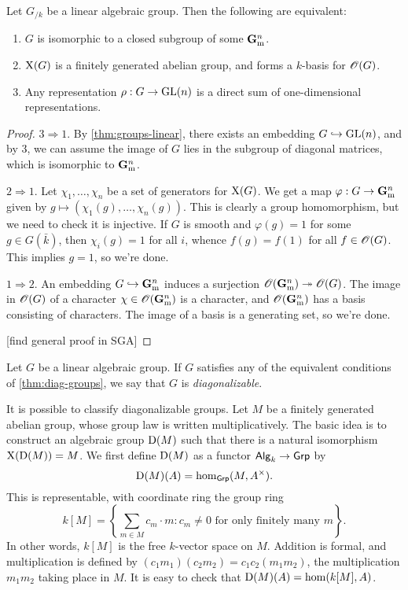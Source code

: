 \begin{theorem}\label{thm:diag-groups}
Let $G_{/k}$ be a linear algebraic group. Then the following are equivalent: 
\begin{enumerate}
\item
$G$ is isomorphic to a closed subgroup of some $\mathbf{G}_\mathrm{m}^n$. 

\item
$\operatorname{X}(G)$ is a finitely generated abelian group, and forms a $k$-basis 
for $\mathscr{O}(G)$. 

\item 
Any representation $\rho:G\to \operatorname{GL}(n)$ is a direct sum of one-dimensional 
representations. 
\end{enumerate}
\end{theorem}
\begin{proof}
$3\Rightarrow 1$. By \autoref{thm:groups-linear}, there exists an embedding 
$G\hookrightarrow \operatorname{GL}(n)$, and by 3, we can assume the image of $G$ lies in the 
subgroup of diagonal matrices, which is isomorphic to $\mathbf{G}_\mathrm{m}^n$. 

$2\Rightarrow 1$. Let $\chi_1,\dots,\chi_n$ be a set of generators for 
$\operatorname{X}(G)$. We get a map $\varphi:G\to \mathbf{G}_\mathrm{m}^n$ given by 
$g\mapsto (\chi_1(g),\dots,\chi_n(g))$. This is clearly a group homomorphism, 
but we need to check it is injective. If $G$ is smooth and 
$\varphi(g)=1$ for some $g\in G(\bar k)$, then 
$\chi_i(g)=1$ for all $i$, whence $f(g)=f(1)$ for all $f\in \mathscr{O}(G)$. This 
implies $g=1$, so we're done. 

$1\Rightarrow 2$. An embedding $G\hookrightarrow \mathbf{G}_\mathrm{m}^n$ induces a surjection 
$\mathscr{O}(\mathbf{G}_\mathrm{m}^n)\twoheadrightarrow \mathscr{O}(G)$. The image in $\mathscr{O}(G)$ of a character 
$\chi\in \mathscr{O}(\mathbf{G}_\mathrm{m}^n)$ is a character, and $\mathscr{O}(\mathbf{G}_\mathrm{m}^n)$ has a basis consisting 
of characters. The image of a basis is a generating set, so we're done. 

[find general proof in SGA]
\end{proof}

\begin{definition}
Let $G$ be a linear algebraic group. If $G$ satisfies any of the 
equivalent conditions of \autoref{thm:diag-groups}, we say that $G$ is 
\emph{diagonalizable}. 
\end{definition}

It is possible to classify diagonalizable groups. Let $M$ be a finitely 
generated abelian group, whose group law is written multiplicatively. The basic 
idea is to construct an algebraic group $\operatorname{D}(M)$ such that there is a 
natural isomorphism $\operatorname{X}(\operatorname{D}(M)) = M$. We first define $\operatorname{D}(M)$ as 
a functor $\mathsf{Alg}_{k}\to \mathsf{Grp}$ by 
\[
  \operatorname{D}(M)(A) = \hom_{\mathsf{Grp}}(M,A^\times) .
\]
This is representable, with coordinate ring the group ring 
\[
  k[M] = \left\{\sum_{m\in M} c_m\cdot m : c_m\ne 0\text{ for only finitely many }m\right\} .
\]
In other words, $k[M]$ is the free $k$-vector space on $M$. Addition is formal, 
and multiplication is defined by $(c_1 m_1)(c_2 m_2) = c_1 c_2 (m_1 m_2)$, the 
multiplication $m_1 m_2$ taking place in $M$. It is easy to check that 
$\operatorname{D}(M)(A)=\hom(k[M],A)$. 

